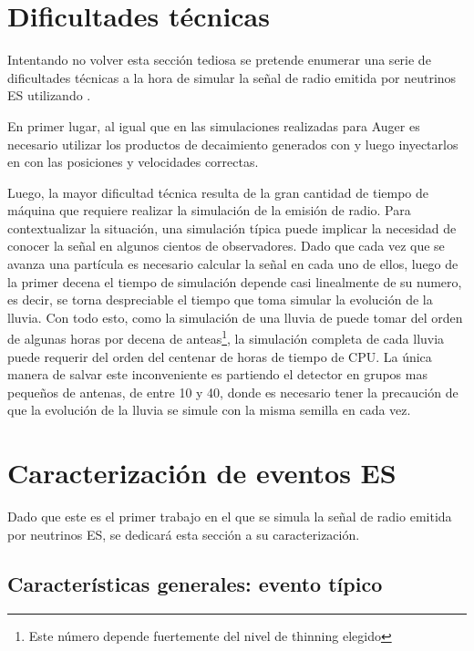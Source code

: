 \section{Dificultades técnicas}

Intentando no volver esta sección tediosa se pretende enumerar una serie de dificultades técnicas a la hora de simular la señal de radio emitida por neutrinos ES utilizando \zhs{}.

En primer lugar, al igual que en las simulaciones realizadas para Auger es necesario utilizar los productos de decaimiento generados con \tauola{} y luego inyectarlos en \aires{} con las posiciones y velocidades correctas.

Luego, la mayor dificultad técnica resulta de la gran cantidad de tiempo de máquina que requiere realizar la simulación de la emisión de radio.
Para contextualizar la situación, una simulación típica puede implicar la necesidad de conocer la señal en algunos cientos de observadores.
Dado que cada vez que se avanza una partícula es necesario calcular la señal en cada uno de ellos, luego de la primer decena el tiempo de simulación depende casi linealmente de su numero, es decir, se torna despreciable el tiempo que toma simular la evolución de la lluvia.
Con todo esto, como la simulación de una lluvia de  puede tomar del orden de algunas horas por decena de anteas\footnote{Este número depende fuertemente del nivel de thinning elegido}, la simulación completa de cada lluvia puede requerir del orden del centenar de horas de tiempo de CPU.
La única manera de salvar este inconveniente es partiendo el detector en grupos mas pequeños de antenas, de entre 10 y 40, donde es necesario tener la precaución de que la evolución de la lluvia se simule con la misma semilla en cada vez.

	
\section{Caracterizaci\'on de eventos ES}

Dado que este es el primer trabajo en el que se simula la señal de radio emitida por neutrinos ES, se dedicará esta sección a su caracterización.

	\subsection{Caracter\'isticas generales: evento típico}
	
